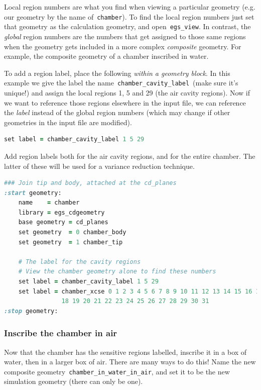 \documentclass[12pt,twoside]{article}
\begin{document}
Local region numbers are what you find when viewing a particular geometry
(e.g. our geometry by the name of \,\Verb|chamber|). To find the local
region numbers just set that geometry as the calculation geometry, and
open \,\Verb|egs_view|. In contrast, the \textit{global} region numbers are the
numbers that get assigned to those same regions when the geometry gets included
in a more complex \textit{composite} geometry. For example, the composite geometry
of a chamber inscribed in water.

To add a region label, place the following \textit{within a geometry block}.
In this example we give the label the name \,\Verb|chamber_cavity_label|\,
(make sure it's unique!) and assign the local regions 1, 5 and 29
(the air cavity regions). Now if we want to reference those regions elsewhere
in the input file,
we can reference the \textit{label} instead of the global region numbers
(which may change if other geometries in the input file are modified).

{\small
\begin{lstlisting}[language=ruby,backgroundcolor=\color{white}]
set label = chamber_cavity_label 1 5 29
\end{lstlisting}
}

Add region labels both for the air cavity regions, and for the entire chamber.
The latter of these will be used for a variance reduction technique.

{\small
\begin{lstlisting}[language=ruby,backgroundcolor=\color{white}]
### Join tip and body, attached at the cd_planes
:start geometry:
    name    = chamber
    library = egs_cdgeometry
    base geometry = cd_planes
    set geometry  = 0 chamber_body
    set geometry  = 1 chamber_tip

    # The label for the cavity regions
    # View the chamber geometry alone to find these numbers
    set label = chamber_cavity_label 1 5 29
    set label = chamber_xcse 0 1 2 3 4 5 6 7 8 9 10 11 12 13 14 15 16 17 \\
                18 19 20 21 22 23 24 25 26 27 28 29 30 31
:stop geometry:
\end{lstlisting}
}

\subsubsection{Inscribe the chamber in air}

Now that the chamber has the sensitive regions labelled, inscribe it in a box
of water, then in a larger box of air. There are many ways to do this!
Name the new composite geometry
\,\Verb|chamber_in_water_in_air|, and set it to be the new simulation geometry
(there can only be one).
\end{document}
